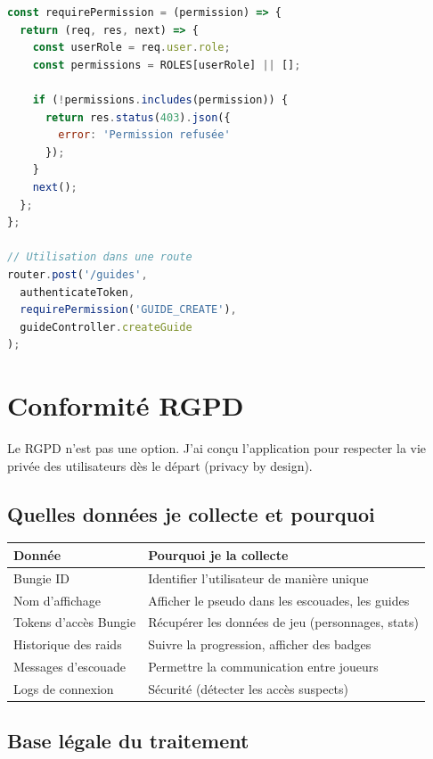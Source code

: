 \begin{lstlisting}[language=JavaScript]
const requirePermission = (permission) => {
  return (req, res, next) => {
    const userRole = req.user.role;
    const permissions = ROLES[userRole] || [];
    
    if (!permissions.includes(permission)) {
      return res.status(403).json({ 
        error: 'Permission refusée' 
      });
    }
    next();
  };
};

// Utilisation dans une route
router.post('/guides', 
  authenticateToken,
  requirePermission('GUIDE_CREATE'),
  guideController.createGuide
);
\end{lstlisting}

\section{Conformité RGPD}

Le RGPD n'est pas une option. J'ai conçu l'application pour respecter la vie privée des utilisateurs dès le départ (privacy by design).

\subsection{Quelles données je collecte et pourquoi}

\begin{center}
\begin{tabular}{|p{4cm}|p{6cm}|}
\hline
\textbf{Donnée} & \textbf{Pourquoi je la collecte} \\
\hline
Bungie ID & Identifier l'utilisateur de manière unique \\
\hline
Nom d'affichage & Afficher le pseudo dans les escouades, les guides \\
\hline
Tokens d'accès Bungie & Récupérer les données de jeu (personnages, stats) \\
\hline
Historique des raids & Suivre la progression, afficher des badges \\
\hline
Messages d'escouade & Permettre la communication entre joueurs \\
\hline
Logs de connexion & Sécurité (détecter les accès suspects) \\
\hline
\end{tabular}
\end{center}

\subsection{Base légale du traitement}

